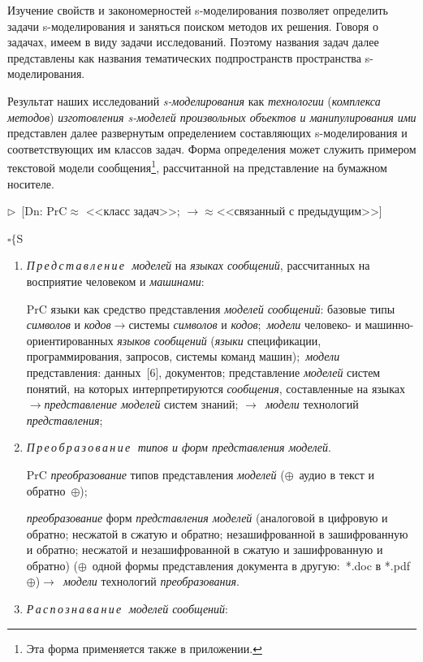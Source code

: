 \begin{multicols}{2}
Изучение свойств и закономерностей s-мо\-де\-ли\-ро\-ва\-ния позволяет 
определить задачи s-мо\-де\-ли\-ро\-ва\-ния и заняться поиском методов их 
решения. Говоря о задачах, имеем в виду задачи исследований. Поэтому названия 
задач далее представлены как названия тематических подпространств пространства 
s-мо\-де\-ли\-ро\-ва\-ния.

Результат наших исследований \textit{s-моделирования} как \textit{технологии} 
(\textit{комплекса методов}) \textit{изготовления s-моделей произвольных 
объектов и манипулирования ими} представлен далее развернутым определением 
составляющих s-моделирования и соответствующих им классов задач. Форма 
определения может служить примером текстовой модели сообщения\footnote[1]{Эта 
форма применяется также в приложении.}, рассчитанной на представление на 
бумажном носителе.

\noindent 
$\triangleright$~[Dn: PrC\;$\approx$ <<класс задач>>; $\rightarrow 
\approx$\;<<связанный с предыдущим>>]

\noindent 
$\square \{$S

\begin{enumerate}[1.]
\item \textit{П\,р\,е\,д\,с\,т\,а\,в\,л\,е\,н\,и\,е\,\ моделей} на \textit{языках
сообщений}, рассчитанных на восприятие человеком и \textit{машинами}:


PrC языки как средство представления \textit{моделей сообщений}: базовые типы 
\textit{символов} и \textit{кодов}\;$\rightarrow$\;системы \textit{символов} и 
\textit{кодов};~\textit{модели} че\-ловеко- и 
ма\-шин\-но-ори\-ен\-ти\-ро\-ван\-ных \textit{языков сооб\-ще\-ний} 
(\textit{языки} спецификации, программирования, запросов, системы команд 
машин);~\textit{модели} представления: данных~[6], документов; представление 
\textit{моделей} систем понятий, на которых интерпретируются 
\textit{сообщения}, составленные на языках~$\rightarrow$\;\textit{представление 
моделей} систем знаний; $\rightarrow$~\textit{модели} технологий 
\textit{представления};
\item \textit{П\,р\,е\,о\,б\,р\,а\,з\,о\,в\,а\,н\,и\,е\,\ типов и форм
представления моделей}.

PrC \textit{преобразование} типов пред\-став\-ле\-ния \textit{моделей} 
($\oplus$~аудио в текст и обратно~$\oplus$);

\textit{преобразование} форм \textit{представления моделей} (аналоговой в 
цифровую и обратно; несжатой в сжатую и обратно; незашифрованной в 
за\-шиф\-ро\-ван\-ную и обратно; несжатой и незашифрованной в сжатую и 
за\-шиф\-ро\-ван\-ную и обратно) ($\oplus$~одной формы представления документа 
в другую:~*.doc в 
*.pdf $\oplus$)\;$\rightarrow$~\textit{модели} технологий 
\textit{преобразования}.
\item \textit{Р\,а\,с\,п\,о\,з\,н\,а\,в\,а\,н\,и\,е\,\ моделей сообщений}:


\end{enumerate}
\end{multicols}
